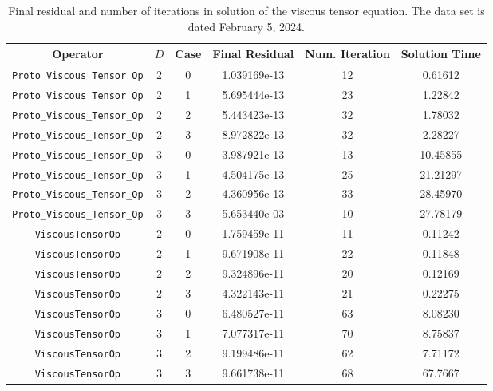 \documentclass{article}
\begin{document}
\begin{small}
\begin{table}
\begin{center}
\begin{tabular}{|c|c|c|c|c||c|} \hline
 Operator                   & $D$ & Case & Final Residual &
 Num. Iteration & Solution Time\\
\hline
 {\tt Proto\_Viscous\_Tensor\_Op} & 2   & 0    & 1.039169e-13   &         12 & 0.61612\\
 {\tt Proto\_Viscous\_Tensor\_Op} & 2   & 1    & 5.695444e-13   &         23 & 1.22842\\
 {\tt Proto\_Viscous\_Tensor\_Op} & 2   & 2    & 5.443423e-13   &         32 & 1.78032\\
 {\tt Proto\_Viscous\_Tensor\_Op} & 2   & 3    & 8.972822e-13   &         32 & 2.28227\\
 {\tt Proto\_Viscous\_Tensor\_Op} & 3   & 0    & 3.987921e-13   &         13 & 10.45855\\
 {\tt Proto\_Viscous\_Tensor\_Op} & 3   & 1    & 4.504175e-13   &         25 & 21.21297\\
 {\tt Proto\_Viscous\_Tensor\_Op} & 3   & 2    & 4.360956e-13   &         33 & 28.45970\\
 {\tt Proto\_Viscous\_Tensor\_Op} & 3   & 3    & 5.653440e-03   &         10 & 27.78179\\
\hline                                                                        
 {\tt ViscousTensorOp}            & 2   & 0    & 1.759459e-11   &         11 & 0.11242 \\
 {\tt ViscousTensorOp}            & 2   & 1    & 9.671908e-11   &         22 & 0.11848 \\
 {\tt ViscousTensorOp}            & 2   & 2    & 9.324896e-11   &         20 & 0.12169 \\
 {\tt ViscousTensorOp}            & 2   & 3    & 4.322143e-11   &         21 & 0.22275 \\
 {\tt ViscousTensorOp}            & 3   & 0    & 6.480527e-11   &         63 & 8.08230 \\
 {\tt ViscousTensorOp}            & 3   & 1    & 7.077317e-11   &         70 & 8.75837 \\
 {\tt ViscousTensorOp}            & 3   & 2    & 9.199486e-11   &         62 & 7.71172 \\
 {\tt ViscousTensorOp}            & 3   & 3    & 9.661738e-11   &         68 & 67.7667\\
\hline
\end{tabular}
\end{center}
\label{tab::viscous}
\caption
    {
      Final residual and number of iterations in solution of the
      viscous tensor equation.
      The data set is dated February 5, 2024.
    }
\end{table}
\end{small}
\end{document}
